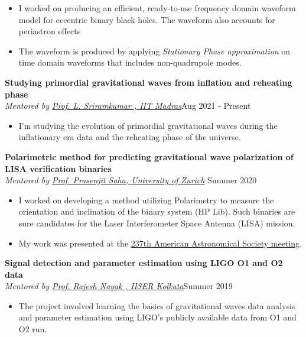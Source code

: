 \documentclass[margin, centered]{res}
\begin{document}
\begin{resume}
\begin{itemize}
    \item I worked on producing an efficient, ready-to-use frequency domain waveform model for eccentric binary black holes. The waveform also accounts for periastron effects 
    \item The waveform is produced by applying \emph{Stationary Phase approximation} on time domain waveforms that includes non-quadrupole modes.
\end{itemize}

\textbf{Studying primordial gravitational waves from inflation and reheating phase} \\
\emph{Mentored by \href{https://physics.iitm.ac.in/~sriram/index.html}{Prof. L. Sriramkumar , IIT Madras}}\hfill Aug 2021 - Present
\begin{itemize}
    \item I'm studying the evolution of primordial gravitational waves during the inflationary era data and the reheating phase of the universe. 
\end{itemize}


\textbf{Polarimetric method for predicting gravitational wave polarization of LISA verification binaries} \\
\emph{Mentored by \href{https://www.ctac.uzh.ch/en/Research/research-groups/Prasenjit-Saha.html}{Prof. Prasenjit Saha, University of Zurich} }\hfill Summer 2020 

\begin{itemize}
    \item I worked on developing a method utilizing Polarimetry to measure the orientation and inclination of the binary system (HP Lib). Such binaries are sure candidates for the  Laser Interferometer Space Antenna (LISA) mission.
    \item My work was presented at the \href{https://aas.org/meetings/aas237}{237th American Astronomical Society meeting}.
\end{itemize}


\textbf{Signal detection and parameter estimation using LIGO O1 and O2 data} \\
\emph{Mentored by \href{https://www.iiserkol.ac.in/~rajesh/}{Prof. Rajesh Nayak , IISER Kolkata}}\hfill Summer 2019
\begin{itemize}
    \item The project involved learning the basics of gravitational waves data analysis and parameter estimation using LIGO's publicly available data from O1 and O2 run.
\end{itemize}




\end{resume}
\end{document}
